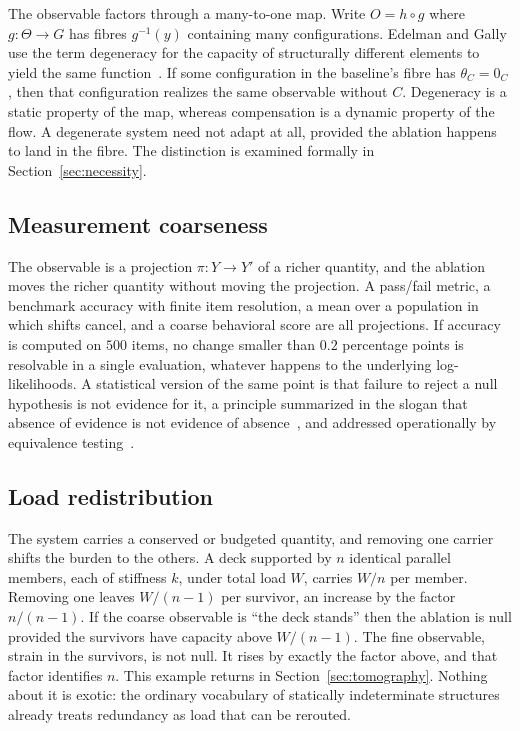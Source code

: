 \documentclass[11pt]{article}
\theoremstyle{definition}
\theoremstyle{remark}
\begin{document}
The observable factors through a many-to-one map. Write $O=h\circ g$ where $g:\Theta\to G$ has fibres $g^{-1}(y)$ containing many configurations. Edelman and Gally use the term degeneracy for the capacity of structurally different elements to yield the same function~\cite{edelman2001}. If some configuration in the baseline's fibre has $\theta_C=0_C$, then that configuration realizes the same observable without $C$. Degeneracy is a static property of the map, whereas compensation is a dynamic property of the flow. A degenerate system need not adapt at all, provided the ablation happens to land in the fibre. The distinction is examined formally in Section~\ref{sec:necessity}.

\subsection{Measurement coarseness}

The observable is a projection $\pi:Y\to Y'$ of a richer quantity, and the ablation moves the richer quantity without moving the projection. A pass/fail metric, a benchmark accuracy with finite item resolution, a mean over a population in which shifts cancel, and a coarse behavioral score are all projections. If accuracy is computed on $500$ items, no change smaller than $0.2$ percentage points is resolvable in a single evaluation, whatever happens to the underlying log-likelihoods. A statistical version of the same point is that failure to reject a null hypothesis is not evidence for it, a principle summarized in the slogan that absence of evidence is not evidence of absence~\cite{altman1995}, and addressed operationally by equivalence testing~\cite{lakens2017}.

\subsection{Load redistribution}

The system carries a conserved or budgeted quantity, and removing one carrier shifts the burden to the others. A deck supported by $n$ identical parallel members, each of stiffness $k$, under total load $W$, carries $W/n$ per member. Removing one leaves $W/(n-1)$ per survivor, an increase by the factor $n/(n-1)$. If the coarse observable is ``the deck stands'' then the ablation is null provided the survivors have capacity above $W/(n-1)$. The fine observable, strain in the survivors, is not null. It rises by exactly the factor above, and that factor identifies $n$. This example returns in Section~\ref{sec:tomography}. Nothing about it is exotic: the ordinary vocabulary of statically indeterminate structures already treats redundancy as load that can be rerouted.
\end{document}
